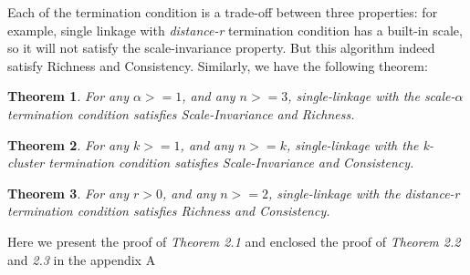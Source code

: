 \documentclass{uonmathreport}
\newtheorem{theorem}{Theorem}[section]
\begin{document}
Each of the termination condition is a trade-off between three properties: for example, single linkage with \textit{distance-r} termination condition has a built-in scale, so it will not satisfy the scale-invariance property. But this algorithm indeed satisfy Richness and Consistency. Similarly, we have the following theorem:
\begin{theorem}
\label{first theorem}
For any $\alpha>=1$, and any $n>=3$, single-linkage with the scale-$\alpha$ termination condition satisfies Scale-Invariance and Richness.
\end{theorem}
\begin{theorem}
For any $k>=1$, and any $n>=k$, single-linkage with the k-cluster termination condition satisfies Scale-Invariance and Consistency.
\end{theorem}
\begin{theorem}
For any $r>0$, and any $n>=2$, single-linkage with the distance-r termination condition satisfies Richness and Consistency.
\end{theorem}

Here we present the proof of \textit{Theorem 2.1} and enclosed the proof of \textit{Theorem 2.2} and \textit{2.3} in the appendix A
\end{document}
